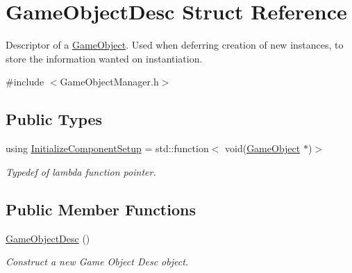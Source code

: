 \hypertarget{structGameObjectDesc}{}\section{Game\+Object\+Desc Struct Reference}
\label{structGameObjectDesc}


Descriptor of a \hyperlink{classGameObject}{Game\+Object}. Used when deferring creation of new instances, to store the information wanted on instantiation.  




{\ttfamily \#include $<$Game\+Object\+Manager.\+h$>$}

\subsection*{Public Types}
\begin{DoxyCompactItemize}
\item 
\mbox{\label{structGameObjectDesc_aa55e1f89cdd761bf046cf6ee18d847ab}} 
using \hyperlink{structGameObjectDesc_aa55e1f89cdd761bf046cf6ee18d847ab}{Initialize\+Component\+Setup} = std\+::function$<$ void(\hyperlink{classGameObject}{Game\+Object} $\ast$)$>$
\begin{DoxyCompactList}\small\item\em Typedef of lambda function pointer. \end{DoxyCompactList}\end{DoxyCompactItemize}
\subsection*{Public Member Functions}
\begin{DoxyCompactItemize}
\item 
\mbox{\label{structGameObjectDesc_a52bf912e7837baadfebbf8e52dd17434}} 
\hyperlink{structGameObjectDesc_a52bf912e7837baadfebbf8e52dd17434}{Game\+Object\+Desc} ()
\begin{DoxyCompactList}\small\item\em Construct a new Game Object Desc object. \end{DoxyCompactList}\end{DoxyCompactItemize}
